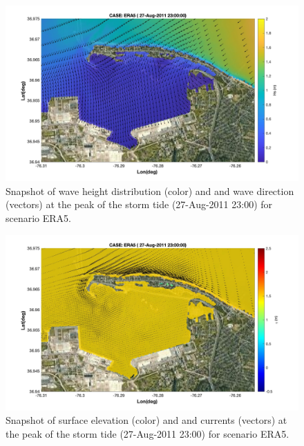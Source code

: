 \documentclass[preprint,12pt,authoryear] {elsarticle}
\begin{document}
\begin{figure}
\centering
\includegraphics[width=\textwidth]{./figures/nearcom_hs_ERA5_91.jpg}
\caption{Snapshot of wave height distribution (color) and and wave direction (vectors) at the peak of the storm tide (27-Aug-2011 23:00) for scenario ERA5. }
\label{ERA5_hs_2}
\centering
\end{figure}

\begin{figure}
\centering
\includegraphics[width=\textwidth]{./figures/nearcom_ele_ERA5_91.jpg}
\caption{Snapshot of surface elevation (color) and and currents (vectors) at the peak of the storm tide (27-Aug-2011 23:00) for scenario ERA5.}
\label{ERA5_eta_2}
\centering
\end{figure}
\end{document}
